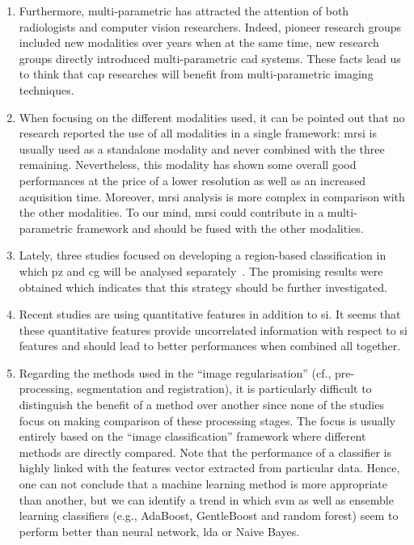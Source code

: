 \begin{enumerate}
\item Furthermore, multi-parametric has attracted the attention of both radiologists and computer vision researchers.
Indeed, pioneer research groups included new modalities over years when at the same time, new research groups directly introduced multi-parametric \ac{cad} systems.
These facts lead us to think that \ac{cap} researches will benefit from multi-parametric imaging techniques.

\item When focusing on the different modalities used, it can be pointed out that no research reported the use of all modalities in a single framework: \ac{mrsi} is usually used as a standalone modality and never combined with the three remaining.
Nevertheless, this modality has shown some overall good performances at the price of a lower resolution as well as an increased acquisition time.
Moreover, \ac{mrsi} analysis is more complex in comparison with the other modalities.
To our mind, \ac{mrsi} could contribute in a multi-parametric framework and should be fused with the other modalities.

\item Lately, three studies focused on developing a region-based classification in which \ac{pz} and \ac{cg} will be analysed separately~\cite{Viswanath2012,Litjens2012,Litjens2014}.
The promising results were obtained which indicates that this strategy should be further investigated.

\item Recent studies are using quantitative features in addition to \ac{si}.
It seems that these quantitative features provide uncorrelated information with respect to \ac{si} features and should lead to better performances when combined all together. 

\item Regarding the methods used in the ``image regularisation'' (cf., pre-processing, segmentation and registration), it is particularly difficult to distinguish the benefit of a method over another since none of the studies focus on making comparison of these processing stages. The focus is usually entirely based on the ``image classification'' framework where different methods are directly compared. Note that the performance of a classifier is highly linked with the features vector extracted from particular data. Hence, one can not conclude that a machine learning method is more appropriate than another, but we can identify a trend in which \ac{svm} as well as ensemble learning classifiers (e.g., AdaBoost, GentleBoost and random forest) seem to perform better than neural network, \ac{lda} or Naive Bayes.


\end{enumerate}
